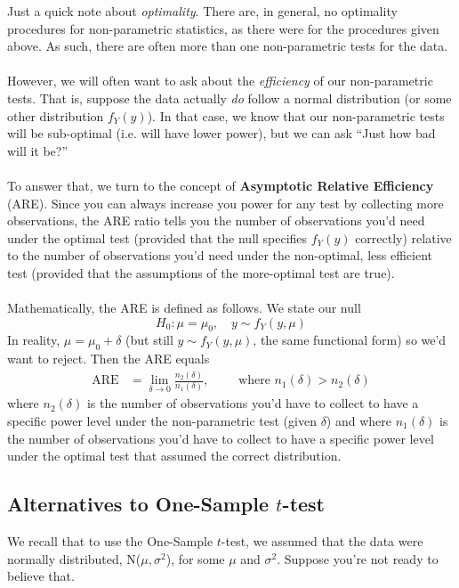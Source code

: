 \documentclass[a4paper,12pt]{scrartcl}
\begin{document}
Just a quick note about \emph{optimality}.  There are, in
general, no optimality procedures for non-parametric statistics, as
there were for the procedures given above.  As such, there are
often more than one non-parametric tests for the data.
\\
\\
However, we will often want to ask about the \emph{efficiency} of
our non-parametric tests.  That is, suppose the data actually
\emph{do} follow a normal distribution (or some other distribution
$f_Y(y)$).  In that case, we know that our non-parametric tests
will be sub-optimal (i.e. will have lower power),
but we can ask ``Just how bad will it be?''
\\
\\
To answer that, we turn to the concept of \textbf{Asymptotic Relative
Efficiency} (ARE). Since you can always increase you power for
any test by collecting more observations, the ARE ratio tells you
the number of observations you'd need under the optimal test
(provided that the null specifies $f_Y(y)$ correctly)
relative to the number
of observations you'd need under the non-optimal, less efficient
test (provided that the assumptions of the more-optimal test are true).
\\
\\
Mathematically, the ARE is defined as follows. We state our null
   \[ H_0: \mu = \mu_0,\quad y \sim f_Y(y, \mu) \]
In reality, $\mu=\mu_0 + \delta$ (but still $y\sim f_Y(y, \mu)$, the
same functional form) so we'd want to reject.
Then the ARE equals
\begin{align*}
   \text{ARE} &= \lim_{\delta \rightarrow 0} \frac{n_2(\delta)}{
   n_1(\delta)}, \qquad \text{ where } n_1(\delta) > n_2(\delta)
\end{align*}
where $n_2(\delta)$ is the number of observations you'd have to collect
to have a specific power level under the non-parametric test
(given $\delta$) and where
$n_1(\delta)$ is the number of observations you'd have to collect
to have a specific power level under the optimal test that assumed
the correct distribution.



\newpage
\subsection{Alternatives to One-Sample $t$-test}

We recall that to use the One-Sample $t$-test, we assumed that the
data were normally distributed, N($\mu,\sigma^2$), for some
$\mu$ and $\sigma^2$. Suppose you're not ready to believe that.
\end{document}
